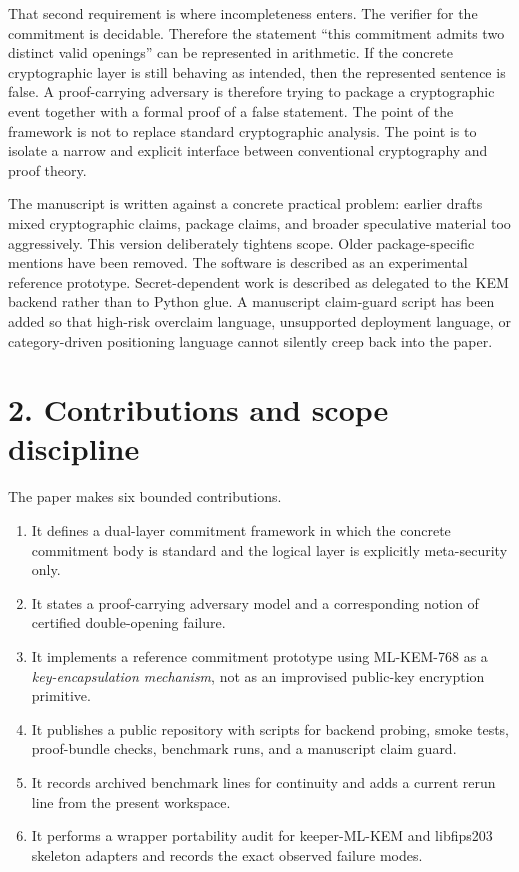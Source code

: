 \documentclass[
  11pt,
]{article}
\providecommand{\tightlist}{%
  \setlength{\itemsep}{0pt}\setlength{\parskip}{0pt}}
\begin{document}
That second requirement is where incompleteness enters. The verifier for
the commitment is decidable. Therefore the statement ``this commitment
admits two distinct valid openings'' can be represented in arithmetic.
If the concrete cryptographic layer is still behaving as intended, then
the represented sentence is false. A proof-carrying adversary is
therefore trying to package a cryptographic event together with a formal
proof of a false statement. The point of the framework is not to replace
standard cryptographic analysis. The point is to isolate a narrow and
explicit interface between conventional cryptography and proof theory.

The manuscript is written against a concrete practical problem: earlier
drafts mixed cryptographic claims, package claims, and broader
speculative material too aggressively. This version deliberately
tightens scope. Older package-specific mentions have been removed. The
software is described as an experimental reference prototype.
Secret-dependent work is described as delegated to the KEM backend
rather than to Python glue. A manuscript claim-guard script has been
added so that high-risk overclaim language, unsupported deployment
language, or category-driven positioning language cannot silently creep
back into the paper.

\section{2. Contributions and scope
discipline}\label{contributions-and-scope-discipline}

The paper makes six bounded contributions.

\begin{enumerate}
\def\labelenumi{\arabic{enumi}.}
\tightlist
\item
  It defines a dual-layer commitment framework in which the concrete
  commitment body is standard and the logical layer is explicitly
  meta-security only.
\item
  It states a proof-carrying adversary model and a corresponding notion
  of certified double-opening failure.
\item
  It implements a reference commitment prototype using ML-KEM-768 as a
  \emph{key-encapsulation mechanism}, not as an improvised public-key
  encryption primitive.
\item
  It publishes a public repository with scripts for backend probing,
  smoke tests, proof-bundle checks, benchmark runs, and a manuscript
  claim guard.
\item
  It records archived benchmark lines for continuity and adds a current
  rerun line from the present workspace.
\item
  It performs a wrapper portability audit for keeper-ML-KEM and
  libfips203 skeleton adapters and records the exact observed failure
  modes.
\end{enumerate}
\end{document}
